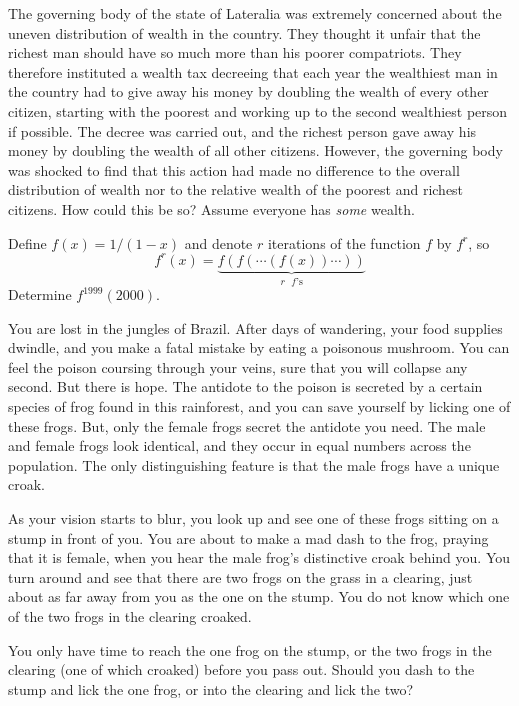 \documentclass{article}
\begin{document}
\begin{exercise}
The governing body of the state of Lateralia was extremely concerned about the uneven distribution of wealth in the country. 
They thought it unfair that the richest man should have so much more than his poorer compatriots. 
They therefore instituted a wealth tax decreeing that each year the wealthiest man in the country had to give away his money by doubling the wealth of every other citizen, starting with the poorest and working up to the second wealthiest person if possible. 
The decree was carried out, and the richest person gave away his money by doubling the wealth of all other citizens. 
However, the governing body was shocked to find that this action had made no difference to the overall distribution of wealth nor to the relative wealth of the poorest and richest citizens. 
How could this be so?
Assume everyone has {\it some} wealth.
\end{exercise}

\begin{exercise}
Define $f(x)=1/(1-x)$ and denote $r$ iterations of the function $f$ by $f^r$, so \[f^r(x)=\underbrace{f(f(\cdots(f(x))\cdots))}_{r\text{ $f$'s}}\] 
Determine $f^{1999}(2000)$.
\end{exercise}

\begin{exercise}
You are lost in the jungles of Brazil. 
After days of wandering, your food supplies dwindle, and you make a fatal mistake by eating a poisonous mushroom. 
You can feel the poison coursing through your veins, sure that you will collapse any second. 
But there is hope. 
The antidote to the poison is secreted by a certain species of frog found in this rainforest, and you can save yourself by licking one of these frogs. 
But, only the female frogs secret the antidote you need. 
The male and female frogs look identical, and they occur in equal numbers across the population. 
The only distinguishing feature is that the male frogs have a unique croak.

As your vision starts to blur, you look up and see one of these frogs sitting on a stump in front of you. 
You are about to make a mad dash to the frog, praying that it is female, when you hear the male frog's distinctive croak behind you. 
You turn around and see that there are two frogs on the grass in a clearing, just about as far away from you as the one on the stump. 
You do not know which one of the two frogs in the clearing croaked.

You only have time to reach the one frog on the stump, or the two frogs in the clearing (one of which croaked) before you pass out. 
Should you dash to the stump and lick the one frog, or into the clearing and lick the two?
\end{exercise}
\end{document}
